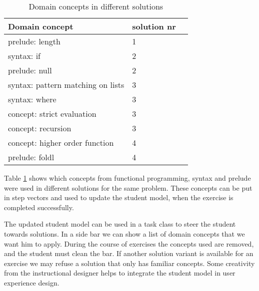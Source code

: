 \begin{table}[H]
\begin{tabular}{| l | l | l |}
\hline
Domain concept & solution nr\\
\hline
prelude: length &  1\\
\hline
syntax: if &  2\\
prelude: null &  2\\
\hline
syntax: pattern matching on lists &  3\\
syntax: where &  3\\
concept: strict evaluation & 3\\
concept: recursion &  3\\
\hline
concept: higher order function  &  4\\
prelude: foldl &  4\\
\hline
\end{tabular}
\caption{Domain concepts in different solutions}
\label{table.cls3}
\end{table}

Table \ref{table.cls3} shows which concepts from functional programming, syntax and prelude were used in different
solutions for the same problem.
These concepts can be put in step vectors and used to update the student model, when the exercise is completed successfully.

The updated student model can be used in a task class to steer the student towards solutions.
In a side bar we can show a list of domain concepts that we want him to apply.
During the course of exercises the concepts used are removed, and the student must clean the bar. 
If another solution variant is available for an exercise we may refuse a solution that only has familiar concepts.
Some creativity from the instructional designer helps to integrate the student model in user experience design.















